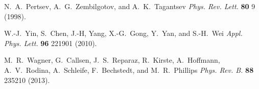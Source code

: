 \documentclass[16pt]{article} %
\begin{document}
\begin{thebibliography}{1}
N.~A.~Pertsev, A.~G.~Zembilgotov, and A.~K.~Tagantsev
\newblock \emph{Phys. Rev. Lett.} \textbf{80} 9 (1998).

W.-J.~Yin, S.~Chen, J.-H, Yang, X.-G.~Gong, Y.~Yan, and S.-H.~Wei
\newblock \emph{Appl. Phys. Lett.} \textbf{96} 221901 (2010).

M.~R.~Wagner, G.~Callsen, J.~S.~Reparaz, R.~Kirste, A.~Hoffmann, A.~V.~Rodina, A.~Schleife, F.~Bechstedt, and M.~R.~Phillips
\newblock \emph{Phys. Rev. B.} \textbf{88} 235210 (2013).



\end{thebibliography}
\end{document}
